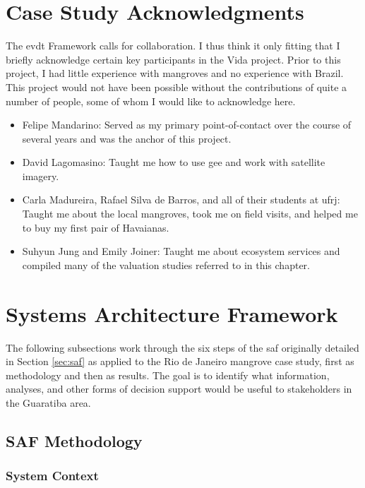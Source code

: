 \section{Case Study Acknowledgments}

The \ac{evdt} Framework calls for collaboration. I thus think it only fitting that I briefly acknowledge certain key participants in the Vida project. Prior to this project, I had little experience with mangroves and no experience with Brazil. This project would not have been possible without the contributions of quite a number of people, some of whom I would like to acknowledge here.

\begin{itemize}[itemsep=0pt,parsep=0pt]
	\item{Felipe Mandarino: Served as my primary point-of-contact over the course of several years and was the anchor of this project.}
	\item{David Lagomasino: Taught me how to use \ac{gee} and work with satellite imagery.}
	\item{Carla Madureira, Rafael Silva de Barros, and all of their students at \ac{ufrj}: Taught me about the local mangroves, took me on field visits, and helped me to buy my first pair of Havaianas.}
	\item{Suhyun Jung and Emily Joiner: Taught me about ecosystem services and compiled many of the valuation studies referred to in this chapter.}
\end{itemize}


\section{Systems Architecture Framework} \label{sec:rio-saf}

The following subsections work through the six steps of the \ac{saf} originally detailed in Section \ref{sec:saf} as applied to the Rio de Janeiro mangrove case study, first as methodology and then as results. The goal is to identify what information, analyses, and other forms of decision support would be useful to stakeholders in the Guaratiba area.

\subsection{SAF Methodology} \label{sec:rio-saf-method}

\subsubsection{System Context} \label{sec:rio-context}


